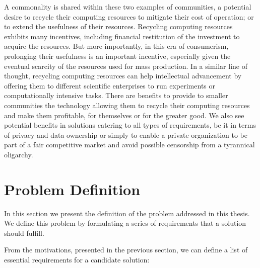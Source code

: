 \documentclass[12pt, titlepage]{uo_temp}
\begin{document}
     A commonality is shared within these two examples of communities, a potential desire to
     recycle their computing resources to mitigate their cost of operation; or to extend the
     usefulness of their resources.
     Recycling computing resources exhibits many incentives, including financial
     restitution of the investment to acquire the resources. But more importantly, in this
     era of consumerism, prolonging their usefulness is an important incentive, especially
     given the eventual scarcity of the resources used for mass production. In a similar
     line of thought, recycling computing resources can help intellectual advancement by
     offering them to different scientific enterprises to run experiments or
     computationally intensive tasks. There are benefits to provide to smaller communities
     the technology allowing them to recycle their computing resources and make them
     profitable, for themselves or for the greater good.  We also see potential benefits in
     solutions catering to all types of requirements, be it in terms of privacy and data
     ownership or simply to enable a private organization to be part of a fair competitive
     market and avoid possible censorship from a tyrannical oligarchy.

     \section{Problem Definition} \label{int_req}
     In this section we present the definition of the problem addressed in this thesis. We
     define this problem by formulating a series of requirements that a solution should
     fulfill.

     From the motivations, presented in the previous section, we can define a list of essential
     requirements for a candidate solution:
\end{document}
